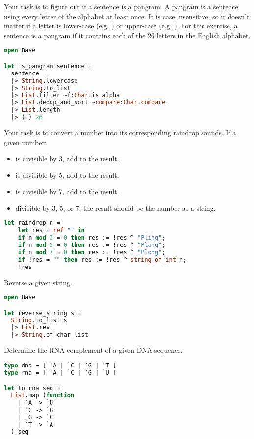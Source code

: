 \problem[Pangram]
Your task is to figure out if a sentence is a pangram.
A pangram is a sentence using every letter of the alphabet at least once.
It is case insensitive, so it doesn't matter if a letter is lower-case (e.g. ) or upper-case (e.g. ).
For this exercise, a sentence is a pangram if it contains each of the 26 letters in the English alphabet.

\begin{lstlisting}[language=OCaml]
open Base

let is_pangram sentence =
  sentence
  |> String.lowercase
  |> String.to_list
  |> List.filter ~f:Char.is_alpha
  |> List.dedup_and_sort ~compare:Char.compare
  |> List.length
  |> (=) 26
\end{lstlisting}

\problem[Raindrops]
Your task is to convert a number into its corresponding raindrop sounds.
If a given number:

\begin{itemize}
  \item is divisible by 3, add  to the result.
  \item is divisible by 5, add  to the result.
  \item is divisible by 7, add  to the result.
  \item {} divisible by 3, 5, or 7, the result should be the number as a string.
\end{itemize}

\begin{lstlisting}[language=OCaml]
let raindrop n =
	let res = ref "" in
	if n mod 3 = 0 then res := !res ^ "Pling";
	if n mod 5 = 0 then res := !res ^ "Plang";
	if n mod 7 = 0 then res := !res ^ "Plong";
	if !res = "" then res := !res ^ string_of_int n;
	!res
\end{lstlisting}

Reverse a given string.

\begin{lstlisting}[language=OCaml]
open Base

let reverse_string s =
  String.to_list s 
  |> List.rev 
  |> String.of_char_list
\end{lstlisting}

Determine the RNA complement of a given DNA sequence.

\begin{lstlisting}[language=OCaml]
type dna = [ `A | `C | `G | `T ]
type rna = [ `A | `C | `G | `U ]

let to_rna seq =
  List.map (function
  	| `A -> `U
    | `C -> `G
    | `G -> `C
    | `T -> `A
  ) seq
\end{lstlisting}

